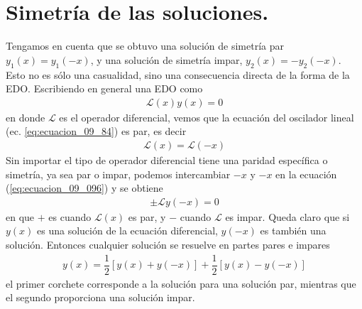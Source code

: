 \section*{Simetría de las soluciones.}
Tengamos en cuenta que se obtuvo una solución de simetría par $y_{1}(x) = y_{1} (-x)$, y una solución de simetría impar, $y_{2}(x) = - y_{2}(-x)$. Esto no es sólo una casualidad, sino una consecuencia directa de la forma de la EDO. Escribiendo en general una EDO como
\begin{align}
\mathcal{L}(x) y(x) = 0
\label{eq:ecuacion_09_096}
\end{align}
en donde $\mathcal{L}$ es el operador diferencial, vemos que la ecuación del oscilador lineal (ec. \ref{eq:ecuacion_09_84}) es par, es decir
\begin{align}
\mathcal{L}(x) = \mathcal{L}(-x)
\label{eq:ecuacion_09_97}
\end{align}
Sin importar el tipo de operador diferencial tiene una paridad específica o simetría, ya sea par o impar, podemos intercambiar $-x$ y $-x$ en la ecuación (\ref{eq:ecuacion_09_096}) y se obtiene
\begin{align}
\pm \mathcal{L} y(-x) = 0
\label{eq:ecuacion_09_98}
\end{align}
en que $+$ es cuando $\mathcal{L}(x)$ es par, y $-$ cuando $\mathcal{L}$ es impar. Queda claro que si $y(x)$ es una solución de la ecuación diferencial, $y(-x)$ es también una solución. Entonces cualquier solución se resuelve en partes pares e impares
\begin{align}
y(x) = \dfrac{1}{2} \left[ y(x) + y(-x) \right] + \dfrac{1}{2} \left[ y(x) - y (-x) \right]
\label{eq:ecuacion_09_99}
\end{align}
el primer corchete corresponde a la solución para una solución par, mientras que el segundo proporciona una solución impar.
